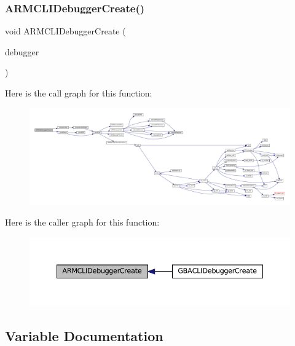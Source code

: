 \subsubsection{\texorpdfstring{A\+R\+M\+C\+L\+I\+Debugger\+Create()}{ARMCLIDebuggerCreate()}}
{\footnotesize\ttfamily void A\+R\+M\+C\+L\+I\+Debugger\+Create (\begin{DoxyParamCaption}\item[{struct C\+L\+I\+Debugger\+System $\ast$}]{debugger }\end{DoxyParamCaption})}

Here is the call graph for this function\+:
\nopagebreak
\begin{figure}[H]
\begin{center}
\leavevmode
\includegraphics[width=350pt]{arm_2debugger_2cli-debugger_8c_a045f36ee0ea5e0ee4fbf4622bfb140ca_cgraph}
\end{center}
\end{figure}
Here is the caller graph for this function\+:
\nopagebreak
\begin{figure}[H]
\begin{center}
\leavevmode
\includegraphics[width=350pt]{arm_2debugger_2cli-debugger_8c_a045f36ee0ea5e0ee4fbf4622bfb140ca_icgraph}
\end{center}
\end{figure}


\subsection{Variable Documentation}
\mbox{\label{arm_2debugger_2cli-debugger_8c_a4369077d6b3042008429e77a98dbd444}} 
